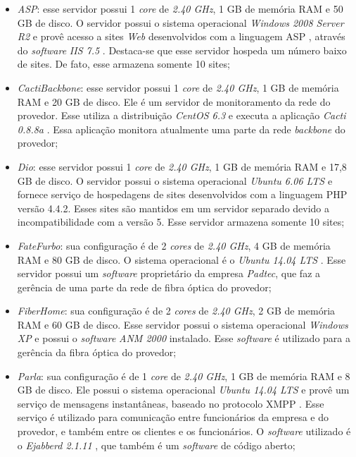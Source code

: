\begin{itemize}
 \item \textit{ASP}: esse servidor possui 1 \textit{core} de \textit{2.40 GHz}, 1 GB de memória \ac{RAM} e 50 GB de disco. 
 O servidor possui o sistema operacional \textit{Windows 2008 Server R2} e provê acesso a sites \textit{Web} desenvolvidos com a linguagem 
 \ac{ASP} \cite{asp}, através do \textit{software} \textit{\ac{IIS} 7.5} \cite{iis}. Destaca-se que esse servidor hospeda um número baixo de sites.
 De fato, esse armazena somente 10 sites;
 
 \item \textit{CactiBackbone}: esse servidor possui 1 \textit{core} de \textit{2.40 GHz}, 1 GB de memória \ac{RAM} e 20 GB de disco. 
 Ele é um servidor de monitoramento da rede do provedor. Esse utiliza a distribuição \textit{CentOS 6.3} \cite{centos} e executa a aplicação 
 \textit{Cacti 0.8.8a} \cite{cacti}. Essa aplicação monitora atualmente uma parte da rede \textit{backbone} do provedor;
 
 \item \textit{Dio}: esse servidor possui 1 \textit{core} de \textit{2.40 GHz}, 1 GB de memória \ac{RAM} e 17,8 GB de disco. 
 O servidor possui o sistema operacional \textit{Ubuntu 6.06 \ac{LTS}} \cite{ubuntu} e fornece serviço de hospedagens de sites desenvolvidos com 
 a linguagem \ac{PHP} versão 4.4.2. Esses sites são mantidos em um servidor separado devido a incompatibilidade com a versão 5. Esse servidor 
 armazena somente 10 sites;
 
 \item \textit{FateFurbo}: sua configuração é de 2 \textit{cores} de \textit{2.40 GHz}, 4 GB de memória \ac{RAM} e 80 GB de disco. 
 O sistema operacional é o \textit{Ubuntu 14.04 \ac{LTS}} \cite{ubuntu}. Esse servidor possui um \textit{software} proprietário da empresa 
 \textit{Padtec}, que faz a gerência de uma parte da rede de fibra óptica do provedor;
 
 \item \textit{FiberHome}: sua configuração é de 2 \textit{cores} de \textit{2.40 GHz}, 2 GB de memória \ac{RAM} e 60 GB de disco. 
 Esse servidor possui o sistema operacional \textit{Windows XP} e possui o \textit{software} \textit{ANM 2000} instalado. Esse \textit{software} 
 é utilizado para a gerência da fibra óptica do provedor;
 
 \item \textit{Parla}: sua configuração é de 1 \textit{core} de \textit{2.40 GHz}, 1 GB de memória \ac{RAM} e 8 GB de disco. 
 Ele possui o sistema operacional \textit{Ubuntu 14.04 \ac{LTS}} \cite{ubuntu} e provê um serviço de mensagens instantâneas, baseado no protocolo 
 \ac{XMPP} \cite{xmpp}. Esse serviço é utilizado para comunicação entre funcionários da empresa e do provedor, e também entre os clientes e 
 os funcionários. O \textit{software} utilizado é o \textit{Ejabberd 2.1.11} \cite{ejabberd}, que também é um \textit{software} de código aberto;


\end{itemize}
